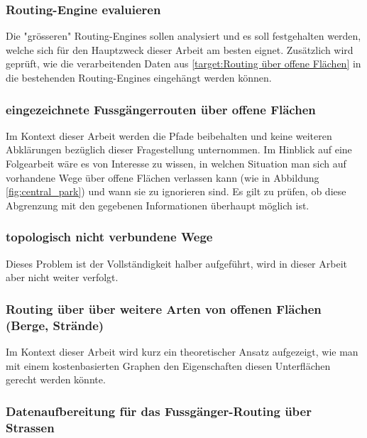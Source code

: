 \subsubsection{Routing-Engine evaluieren}
\label{target:Routing-Enginge evaluieren}
Die "grösseren" Routing-Engines sollen analysiert und es soll festgehalten werden, welche sich für den Hauptzweck dieser Arbeit am besten eignet. Zusätzlich wird geprüft, wie die verarbeitenden Daten aus \ref{target:Routing über offene Flächen} in die bestehenden Routing-Engines eingehängt werden können.

\subsubsection{eingezeichnete Fussgängerrouten über offene Flächen}
\label{target:eingezeichnete Fussgängerrouten über offene Flächen}
Im Kontext dieser Arbeit werden die Pfade beibehalten und keine weiteren Abklärungen bezüglich dieser Fragestellung unternommen. Im Hinblick auf eine Folgearbeit wäre es von Interesse zu wissen, in welchen Situation man sich auf vorhandene Wege über offene Flächen verlassen kann (wie in Abbildung \ref{fig:central_park}) und wann sie zu ignorieren sind. Es gilt zu prüfen, ob diese Abgrenzung mit den gegebenen Informationen überhaupt möglich ist. 

\subsubsection{topologisch nicht verbundene Wege}
\label{target:topologisch nicht verbundene Wege}
Dieses Problem ist der Vollständigkeit halber aufgeführt, wird in dieser Arbeit aber nicht weiter verfolgt.

\subsubsection{Routing über über weitere Arten von offenen Flächen (Berge, Strände)}
\label{target:Routing über über weitere Arten von offenen Flächen (Berge, Strände)}
Im Kontext dieser Arbeit wird kurz ein theoretischer Ansatz aufgezeigt, wie man mit einem kostenbasierten Graphen den Eigenschaften diesen Unterflächen gerecht werden könnte.

\subsubsection{Datenaufbereitung für das Fussgänger-Routing über Strassen}
\label{target:Datenaufbereitung für das Fussgänger-Routing über Strassen}

